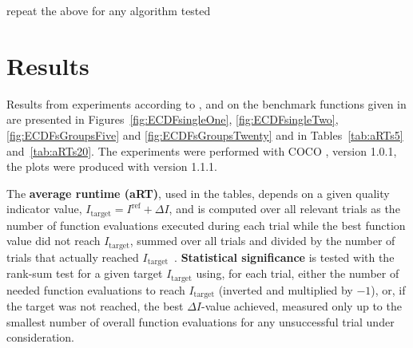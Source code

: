 \documentclass{sig-alternate}
\newcommand{\DI}{\ensuremath{\Delta I}}
\newcommand{\Itarget}{\ensuremath{I_\mathrm{target}}}
\newcommand{\change}[1]{{\color{red} #1}}
\newcommand{\hvref}{I^{\mathrm{ref}}}
\begin{document}
\change{repeat the above for any algorithm tested}

\section{Results}

Results from experiments according to \cite{hansen2016exp},
\cite{hansen2016perfass} and \cite{biobj2016perfass} on the benchmark
functions given in \cite{biobj2016func} are presented in
Figures~\ref{fig:ECDFsingleOne}, \ref{fig:ECDFsingleTwo}, \ref{fig:ECDFsGroupsFive} and
\ref{fig:ECDFsGroupsTwenty} and in Tables~\ref{tab:aRTs5} and~\ref{tab:aRTs20}.
The experiments were performed with COCO \cite{hansen2016cocoplat}, version
\change{1.0.1}, the plots were produced with version \change{1.1.1}.

The \textbf{average runtime (aRT)}, used in the %
tables,
depends on a given quality indicator value, $\Itarget=\hvref+\DI$, and is
computed over all relevant trials as the number of function
evaluations executed during each trial while the best function value
did not reach \Itarget, summed over all trials and divided by the
number of trials that actually reached \Itarget\
\cite{hansen2016exp,price1997dev}.  \textbf{Statistical significance}
is tested with the rank-sum test for a given target $\Itarget$
using, for each trial,
either the number of needed function evaluations to reach
$\Itarget$ (inverted and multiplied by $-1$), or, if the target
was not reached, the best $\DI$-value achieved, measured only up to
the smallest number of overall function evaluations for any
unsuccessful trial under consideration.




\end{document}
